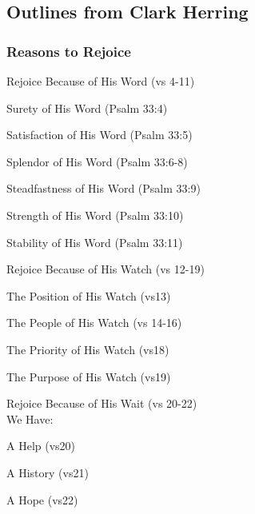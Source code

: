 \subsection{Outlines from Clark Herring}


\subsubsection{Reasons to Rejoice}

\begin{compactenum}[I.]
    \item Rejoice Because of His Word (vs 4-11)
    \begin{compactenum}[A.]
		\item Surety of His Word (Psalm 33:4)
		\item Satisfaction of His Word (Psalm 33:5)
		\item Splendor of His Word (Psalm 33:6-8)
		\item Steadfastness of His Word (Psalm 33:9)
		\item Strength of His Word (Psalm 33:10)
		\item  Stability of His Word (Psalm 33:11)
	\end{compactenum}
    \item Rejoice Because of His Watch (vs 12-19)
    \begin{compactenum}[A.]
		\item The Position of His Watch (vs13)
		\item The People of His Watch (vs 14-16)
		\item The Priority of His Watch (vs18)
		\item The Purpose of His Watch (vs19)
	\end{compactenum}
    \item Rejoice Because of His Wait (vs 20-22)\\We Have:
    \begin{compactenum}[A.]
		\item A Help (vs20)
		\item A History (vs21)
		\item A Hope (vs22)
	\end{compactenum}
\end{compactenum}

